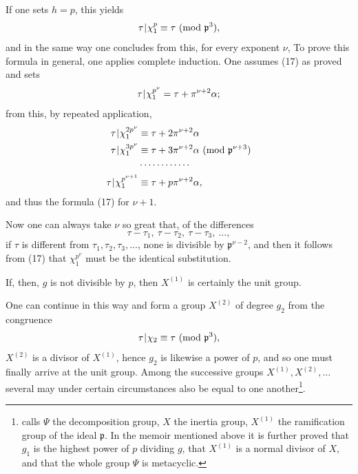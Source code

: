If one sets $h = p$, this yields
\[ \tau\mkern1mu|\mkern1mu\chi_1^p \equiv \tau\ (\mathrm{mod}\ \mathfrak{p}^3), \]
and in the same way one concludes from this, for every exponent $\nu$,
To prove this formula in general, one applies complete induction. One assumes (17) as proved and sets
\[ \tau\mkern1mu|\mkern1mu\chi_1^{p^\nu} = \tau + \pi^{\nu+2}\alpha; \]
from this, by repeated application,
\[
\begin{aligned}
\tau\mkern1mu|\mkern1mu\chi_1^{2p^\nu} &\equiv \tau + 2\pi^{\nu+2}\alpha \\
\tau\mkern1mu|\mkern1mu\chi_1^{3p^\nu} &\equiv \tau + 3\pi^{\nu+2}\alpha\ (\mathrm{mod}\ \mathfrak{p}^{\nu+3}) \\
&\cdots\cdots\cdots\cdots \\
\tau\mkern1mu|\mkern1mu\chi_1^{p^{\nu+1}} &\equiv \tau + p\pi^{\nu+2}\alpha,
\end{aligned}
\]
and thus the formula (17) for $\nu + 1$.

Now one can always take $\nu$ so great that, of the differences
\[ \tau - \tau_1,\ \tau - \tau_2,\ \tau - \tau_3,\ \ldots, \]
if $\tau$ is different from $\tau_1, \tau_2, \tau_3, \ldots$, none is divisible by $\mathfrak{p}^{\nu-2}$, and then it follows from (17) that $\chi_1^{p^\nu}$ must be the identical substitution. 

If, then, $g$ is not divisible by $p$, then $X^{(1)}$ is certainly the unit group.

One can continue in this way and form a group $X^{(2)}$ of degree $g_2$ from the congruence
\[ \tau\mkern1mu|\mkern1mu\chi_2 \equiv \tau\ (\mathrm{mod}\ \mathfrak{p}^3), \]
$X^{(2)}$ is a divisor of $X^{(1)}$, hence $g_2$ is likewise a power of $p$, and so one must finally arrive at the unit group. Among the successive groups $X^{(1)}, X^{(2)}, \ldots$ several may under certain circumstances also be equal to one another\footnote{ calls $\Psi$ the decomposition group, $X$ the inertia group, $X^{(1)}$ the ramification group of the ideal $\mathfrak{p}$. In the memoir mentioned above it is further proved that $g_1$ is the highest power of $p$ dividing $g$, that $X^{(1)}$ is a normal divisor of $X$, and that the whole group $\Psi$ is metacyclic.}.
